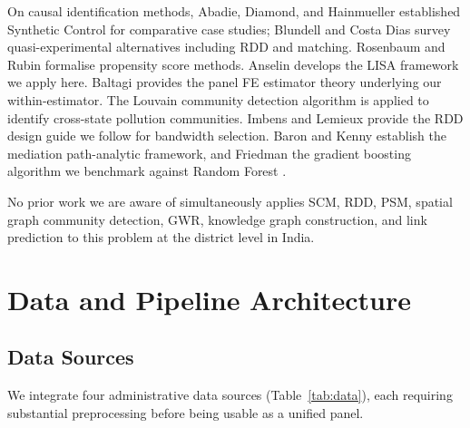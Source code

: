 \documentclass{article}
\begin{document}
On causal identification methods, Abadie, Diamond, and Hainmueller \cite{abadie2010}
established Synthetic Control for comparative case studies; Blundell and Costa Dias
\cite{blundell2009} survey quasi-experimental alternatives including RDD and matching.
Rosenbaum and Rubin \cite{rosenbaum1983} formalise propensity score methods. Anselin
\cite{anselin1995} develops the LISA framework we apply here. Baltagi \cite{baltagi2008}
provides the panel FE estimator theory underlying our within-estimator. The Louvain
community detection algorithm \cite{blondel2008} is applied to identify cross-state
pollution communities. Imbens and Lemieux \cite{imbens2008} provide the RDD design guide
we follow for bandwidth selection. Baron and Kenny \cite{baron1986} establish the
mediation path-analytic framework, and Friedman \cite{friedman2001} the gradient boosting
algorithm we benchmark against Random Forest \cite{breiman2001}.

No prior work we are aware of simultaneously applies SCM, RDD, PSM, spatial graph community
detection, GWR, knowledge graph construction, and link prediction to this problem at the
district level in India.

\section{Data and Pipeline Architecture}
\label{sec:data}

\subsection{Data Sources}

We integrate four administrative data sources (Table~\ref{tab:data}), each requiring
substantial preprocessing before being usable as a unified panel.
\end{document}
